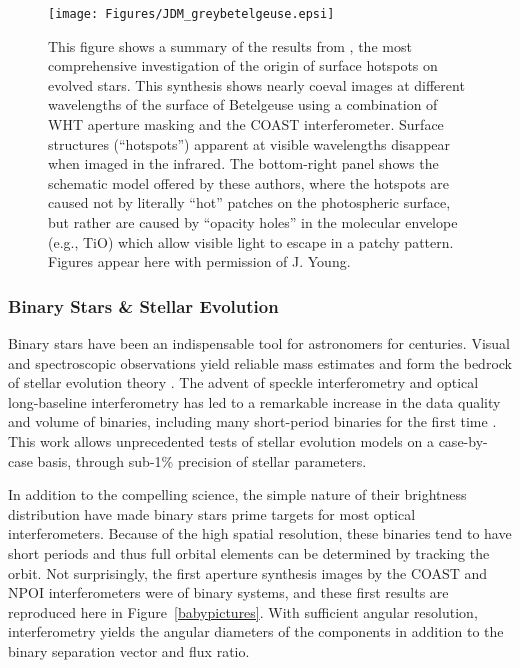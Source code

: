 \documentclass[12pt]{iopart}
\begin{document}
\begin{figure}[tbhp]
\begin{center}
\texttt{[image: Figures/JDM\_greybetelgeuse.epsi]}
\caption{\footnotesize This figure shows a summary of the results from
  \citet{young2000b}, the most comprehensive investigation of the
  origin of surface hotspots on evolved stars.  This synthesis
  shows nearly coeval images at different wavelengths of the surface
  of Betelgeuse using a combination of WHT aperture masking and the
  COAST interferometer.  Surface structures (``hotspots'') apparent at
  visible wavelengths disappear when imaged in the infrared.  The
  bottom-right panel shows the schematic model offered by these
  authors, where the hotspots are caused not by literally ``hot''
  patches on the photospheric surface, but rather are caused by
  ``opacity holes'' in the molecular envelope (e.g., TiO) which allow
  visible light to escape in a patchy pattern.  Figures appear here with
  permission of J. Young.
\label{betelgeuse}}
\end{center}
\end{figure}
   


\subsubsection{Binary Stars \& Stellar Evolution}

Binary stars have been an indispensable tool for astronomers for
centuries. Visual and spectroscopic observations yield reliable mass
estimates and form the bedrock of stellar evolution theory
\citep[e.g.,][]{eggen1967}.  The advent of speckle interferometry and
optical long-baseline interferometry has led to a remarkable increase
in the data quality and volume of binaries, including many
short-period binaries for the first time
\citep[e.g.,][]{mcalister1985, hartkopf2001}.  This work allows
unprecedented tests of stellar evolution models on a case-by-case
basis, through sub-1\% precision of stellar parameters.

In addition to the compelling science, the simple nature of their
brightness distribution have made binary stars prime targets for most
optical interferometers.  Because of the high spatial resolution,
these binaries tend to have short periods and thus full orbital
elements can be determined by tracking the orbit.  Not surprisingly,
the first aperture synthesis images by the COAST and NPOI
interferometers were of binary systems, and these first results are
reproduced here in Figure~\ref{babypictures}.  With sufficient angular
resolution, interferometry yields the angular diameters of the components in addition
to the binary separation vector and flux ratio.
\end{document}
